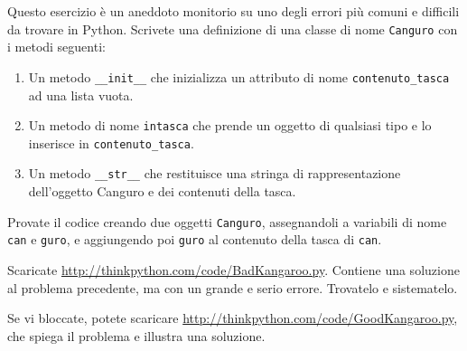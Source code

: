 \documentclass[10pt]{book}
\begin{document}
\begin{exercise}

Questo esercizio è un aneddoto monitorio su uno degli errori più comuni e difficili da trovare in Python. Scrivete una definizione di una classe di nome {\tt Canguro} con i metodi seguenti:

\begin{enumerate}

\item Un metodo \verb"__init__" che inizializza un attributo di nome
\verb"contenuto_tasca" ad una lista vuota.

\item Un metodo di nome \verb"intasca" che prende un oggetto di qualsiasi tipo e lo inserisce in \verb"contenuto_tasca".

\item Un metodo \verb"__str__" che restituisce una stringa di rappresentazione  dell'oggetto Canguro e dei contenuti della tasca.

\end{enumerate}
%
Provate il codice creando due oggetti {\tt Canguro}, assegnandoli a variabili di nome {\tt can} e {\tt guro}, e aggiungendo poi {\tt guro} al contenuto della tasca di {\tt can}.

Scaricate \url{http://thinkpython.com/code/BadKangaroo.py}.  Contiene una soluzione al problema precedente, ma con un grande e serio errore. Trovatelo e sistematelo.  

Se vi bloccate, potete scaricare
\url{http://thinkpython.com/code/GoodKangaroo.py}, che spiega il problema e illustra una soluzione.

\end{exercise}
\end{document}
